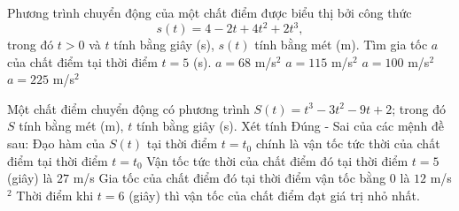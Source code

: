 

\begin{ex}%
	Phương trình  chuyển động của một chất điểm được biểu thị bởi công thức $$s(t)=4-2t+4t^2+2t^3,$$ trong đó $t > 0$ và $t$ tính bằng giây (s), $s(t)$ tính bằng mét (m). Tìm gia tốc $a$ của chất điểm tại thời điểm $t=5$ (s).
	 \choice
		{\True  $a=68$ m/s$^2$}
		{$a=115$  m/s$^2$}
		{$a=100$  m/s$^2$}
		{$a=225$ m/s$^2$} 
\end{ex}



\begin{ex}%
 Một chất điểm chuyển động có phương trình $S(t) = t^3 - 3t^2 - 9t + 2$; trong đó $S$ tính bằng mét (m), $t$ tính bằng  giây (s). Xét tính Đúng - Sai của các mệnh đề sau:
 \choiceTF 
  {\True Đạo hàm của $S(t)$ tại thời điểm $t=t_0$ chính là vận tốc tức thời của chất điểm tại thời điểm $t=t_0$} 
  {Vận tốc tức thời của chất điểm đó tại thời điểm $t=5$ (giây)  là $27$ m/s}
  {\True Gia tốc của chất điểm đó tại thời điểm vận tốc bằng  $0$ là $12$ m/s$^2$}
  {Thời điểm khi $t=6$ (giây) thì vận  tốc của chất điểm đạt giá trị nhỏ nhất.}
\end{ex}

